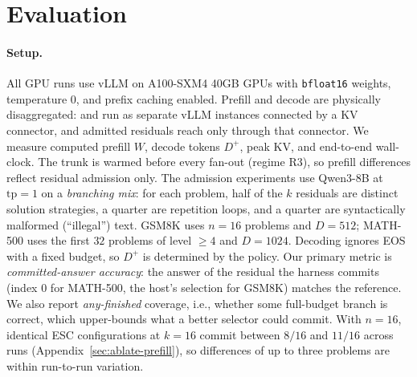 \section{Evaluation}
\label{sec:eval}

\paragraph{Setup.}
All GPU runs use vLLM on A100-SXM4 40GB GPUs with \texttt{bfloat16} weights, temperature $0$, and prefix caching enabled.
Prefill and decode are physically disaggregated: \Pin and \Din run as separate vLLM instances connected by a KV connector, and admitted residuals reach \Din only through that connector.
We measure computed prefill $W$, decode tokens $D^{+}$, peak KV, and end-to-end wall-clock.
The trunk is warmed before every fan-out (regime R3), so prefill differences reflect residual admission only.
The admission experiments use Qwen3-8B at $\mathrm{tp}{=}1$ on a \emph{branching mix}: for each problem, half of the $k$ residuals are distinct solution strategies, a quarter are repetition loops, and a quarter are syntactically malformed (``illegal'') text.
GSM8K uses $n{=}16$ problems and $D{=}512$; MATH-500 uses the first $32$ problems of level $\ge4$ and $D{=}1024$.
Decoding ignores EOS with a fixed budget, so $D^{+}$ is determined by the policy.
Our primary metric is \emph{committed-answer accuracy}: the answer of the residual the harness commits (index $0$ for MATH-500, the host's selection for GSM8K) matches the reference.
We also report \emph{any-finished} coverage, i.e., whether some full-budget branch is correct, which upper-bounds what a better selector could commit.
With $n{=}16$, identical ESC configurations at $k{=}16$ commit between $8/16$ and $11/16$ across runs (Appendix~\ref{sec:ablate-prefill}), so differences of up to three problems are within run-to-run variation.

